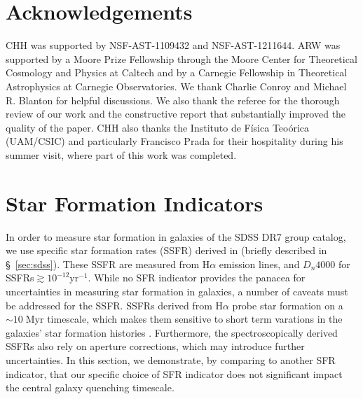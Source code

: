 \documentclass[iop,apj,tighten,twocolappendix,numberedappendix]{emulateapj}
\begin{document}

\section*{Acknowledgements}
CHH was supported by NSF-AST-1109432 and NSF-AST-1211644. 
ARW was supported by a Moore Prize Fellowship through the 
Moore Center for Theoretical Cosmology and Physics at Caltech 
and by a Carnegie Fellowship in Theoretical Astrophysics at 
Carnegie Observatories. We thank Charlie Conroy and Michael R. Blanton for 
helpful discussions. We also thank the referee for the thorough
review of our work and the constructive report that substantially 
improved the quality of the paper. CHH also thanks the Instituto  
de F\'{i}sica Teo\'{o}rica (UAM/CSIC) and particularly Francisco 
Prada for their hospitality during his summer visit, where part 
of this work was completed.

\appendix
\section{Star Formation Indicators} \label{app:sfr}
In order to measure star formation in galaxies of the SDSS DR7 
group catalog, we use specific star formation rates (SSFR) derived
in \cite{Brinchmann:2004aa} (briefly described in \S~\ref{sec:sdss}). 
These SSFR are measured from H$\alpha$ emission lines, and 
$D_n4000$ for SSFRs$\gtrsim 10^{-12}\mathrm{yr}^{-1}$. While no 
SFR indicator provides the panacea for uncertainties in measuring
star formation in galaxies, a number of caveats must be addressed 
for the \cite{Brinchmann:2004aa} SSFR. SSFRs derived from H$\alpha$ 
probe star formation on a $\sim 10\;\mathrm{Myr}$ timescale, which 
makes them sensitive to short term varations in the galaxies' star 
formation histories \citep{Kennicutt:2012aa}. Furthermore, the 
spectroscopically derived \cite{Brinchmann:2004aa} SSFRs also 
rely on aperture corrections, which may introduce further 
uncertainties. In this section, we demonstrate, by comparing to 
another SFR indicator, that our specific choice of SFR indicator 
does not significant impact the central galaxy quenching 
timescale. 
\end{document}
